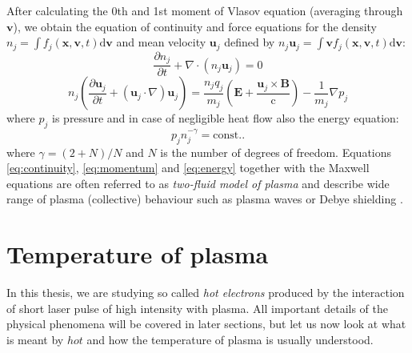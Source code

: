 After calculating the 0th and 1st moment of Vlasov equation (averaging through $\bm{v}$), we obtain the equation of continuity and force equations for the density $n_j = \int f_j\left(\bm{x},\bm{v},t\right)\mathrm{d}\bm{v}$ and mean velocity $\bm{u}_j$ defined by $n_j\bm{u}_j = \int \bm{v} f_j\left(\bm{x},\bm{v},t\right)\mathrm{d}\bm{v}$:
\begin{equation}
	\label{eq:continuity}
	\frac{\partial n_j}{\partial t} + \nabla\cdot\left(n_j \bm{u}_j\right) = 0
\end{equation}
\begin{equation}
	\label{eq:momentum}
	n_j \left(\frac{\partial \bm{u}_j}{\partial t} + \left(\bm{u}_j\cdot\nabla\right)\bm{u}_j\right) = \frac{n_j q_j}{m_j}\left(\bm{E} + \frac{\bm{u}_j\times\bm{B}}{\mathrm{c}}\right) - \frac{1}{m_j}\nabla p_j
\end{equation}
\noindent where $p_j$ is pressure and in case of negligible heat flow also the energy equation:
\begin{equation}
	\label{eq:energy}
	p_jn_j^{-\gamma} = \mathrm{const.}.
\end{equation}
\noindent where $\gamma = \left(2+N\right)/N$ and $N$ is the number of degrees of freedom. Equations \ref{eq:continuity}, \ref{eq:momentum} and \ref{eq:energy} together with the Maxwell equations are often referred to as \textit{two-fluid model of plasma} and describe wide range of plasma (collective) behaviour such as plasma waves or Debye shielding \cite{laser-plasma4}.

\section{Temperature of plasma}
\label{sec:temperature-intro}
In this thesis, we are studying so called \textit{hot electrons} produced by the interaction of short laser pulse of high intensity with plasma. All important details of the physical phenomena will be covered in later sections, but let us now look at what is meant by $hot$ and how the temperature of plasma is usually understood.

